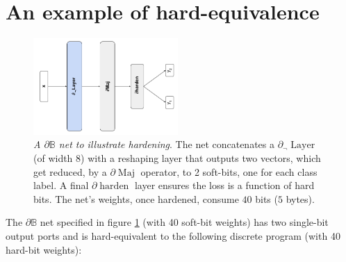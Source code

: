 \documentclass{article}
\theoremstyle{plain}
\theoremstyle{definition}
\theoremstyle{remark}
\begin{document}
\section{An example of hard-equivalence}\label{sec:discrete}

\begin{figure}[h!]
	\centering
	\includegraphics[width=0.49\textwidth]{../toy-example-architecture.png}
	\caption{{\em A $\partial\mathbb{B}$ net to illustrate hardening}. The net concatenates a $\partial_{\neg}\!\operatorname{Layer}$ (of width 8) with a reshaping layer that outputs two vectors, which get reduced, by a $\partial\!\operatorname{Maj}$ operator,  to 2 soft-bits, one for each class label. A final $\partial\!\operatorname{harden}$ layer ensures the loss is a function of hard bits. The net's weights, once hardened, consume $40$ bits ($5$ bytes).}
	\label{fig:toy-example-architecture}
\end{figure}

The $\partial\mathbb{B}$ net specified in figure \ref{fig:toy-example-architecture} (with 40 soft-bit weights) has two single-bit output ports and is hard-equivalent to the following discrete program (with 40 hard-bit weights):
\end{document}
